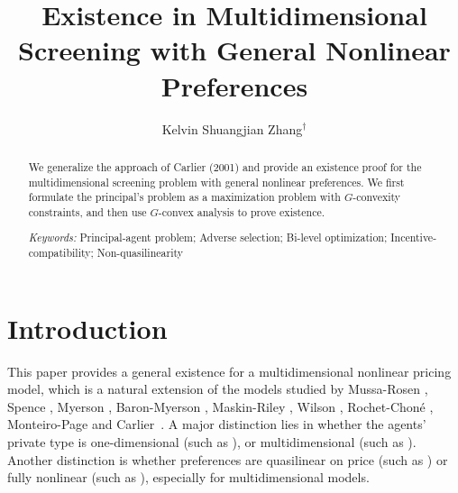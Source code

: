 \documentclass[a4paper, 11pt]{amsart}
\title{Existence in Multidimensional Screening with General Nonlinear Preferences}%
\author{Kelvin Shuangjian Zhang$^\dagger$}\thanks{$^\dagger$Department of Mathematics, University of Toronto, Toronto, Ontario, Canada, M5S 2E4 {\tt szhang@math.toronto.edu}}
\numberwithin{equation}{section}
\theoremstyle{plain}
\theoremstyle{definition}
\theoremstyle{remark}
\begin{document}
\begin{abstract}
	We generalize the approach of Carlier (2001) and provide an existence proof for the multidimensional screening problem with general nonlinear preferences. 
	{We first} formulate the principal's {problem} %
	as a maximization problem with $G$-convexity constraints, %
	{and then use $G$-convex analysis to prove existence.} \medskip 

	{\it Keywords:} Principal-agent problem; Adverse selection; Bi-level optimization; Incentive-compatibility; Non-quasilinearity
\end{abstract}

\bigskip

\maketitle

\section{Introduction}\label{section:introduction}
	This paper provides a general existence for a multidimensional nonlinear pricing model,  which is a natural extension of the models studied by Mussa-Rosen \cite{MussaRosen78}, %
	Spence \cite{Spence74, Spence80}, Myerson \cite{Myerson81}, Baron-Myerson \cite{BaronMyerson82}, Maskin-Riley \cite{MaskinRiley84}, Wilson \cite{Wilson93}, Rochet-Chon\'e \cite{RochetChone98}, Monteiro-Page \cite{MonteiroPage98} and  Carlier~\cite{Carlier01}. A major distinction lies in whether the agents' private type is one-dimensional (such as \cite{MussaRosen78, MaskinRiley84}), or multidimensional (such as \cite{RochetChone98,MonteiroPage98, Carlier01}). Another distinction is whether preferences are quasilinear on price (such as \cite{Armstrong96, Carlier01}) or fully nonlinear (such as \cite{NoldekeSamuelson15p, McCannZhang17}), especially for multidimensional models.  
	\medskip
	
\end{document}
